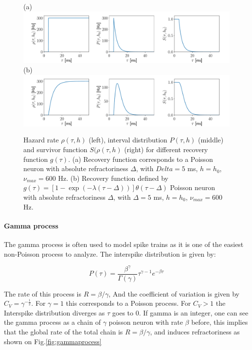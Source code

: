 \documentclass[a4paper,11pt,twoside]{article}
\numberwithin{equation}{section}
\begin{document}
\begin{figure}[h!]
	(a) \\
	\includegraphics[width=\linewidth]{poissonRHOSP.pdf}
	(b)\\
	\includegraphics[width=\linewidth]{expRHOSP.pdf}
	\caption{Hazard rate $\rho(\tau,h)$ (left), interval distribution $P(\tau,h)$ (middle) and survivor function $S(\rho(\tau,h)$ (right) for different recovery function $g(\tau)$. (a) Recovery function corresponds to a Poisson neuron with absolute refractoriness $\Delta$, with $Delta=5$ ms, $h=h_0$, $\nu_{max}=600$ Hz.  (b) Recovery function defined  by $ g(\tau)=\left[1-\exp(-\lambda(\tau-\Delta))\right]\theta(\tau-\Delta)$ Poisson neuron with absolute refractoriness $\Delta$, with $\Delta=5$ ms, $h=h_0$, $\nu_{max}=600$ Hz.  }
	\label{fig:renewalprocess}
\end{figure}


\paragraph{Gamma process}

The gamma process is often used to model spike trains as it is one of the easiest non-Poisson process to analyze. The interspike distribution is given by:

\begin{equation}
\label{eq:gamma}
P(\tau)=\frac{\beta^\gamma}{\Gamma(\gamma)}\tau^{\gamma-1}e^{-\beta\tau}
\end{equation}

The rate of this process  is $R=\beta/\gamma$, And the coefficient of variation is given by $C_V=\gamma^{-\frac{1}{2}}$. For $\gamma=1$ this corresponds to a Poisson process. For $C_V>1$ the Interspike distribution diverges as $\tau$ goes to $0$. If gamma is an integer, one can see the gamma process as a chain of $\gamma$ poisson neuron with rate $\beta$ before, this implies that the global rate of the total chain is $R=\beta/\gamma$, and induces refractoriness as shown on Fig.\ref{fig:gammaprocess}
\end{document}
